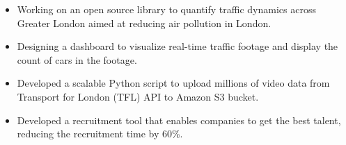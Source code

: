 \documentclass[10pt,a4paper,ragged2e]{altacv}
\begin{document}


\begin{fullwidth}
\makecvheader
\end{fullwidth}



\begin{itemize}
\item Working on an open source library to quantify traffic dynamics across Greater London aimed at reducing air pollution in London.
\item Designing a dashboard to visualize real-time traffic footage and display the count of cars in the footage.
\item Developed a scalable Python script to upload millions of video data from Transport for London (TFL) API to Amazon S3 bucket.
\end{itemize}

\divider

\begin{itemize}
\item Developed a recruitment tool that enables companies to get the best talent, reducing the recruitment time by 60\%.
\end{itemize}
\end{document}
